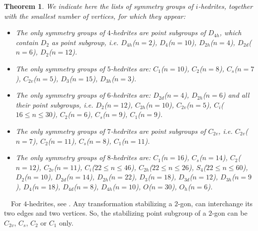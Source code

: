 \documentclass[12pt]{article}
\newtheorem{theorem}{Theorem}
\newcommand{\proof}{\noindent{\bf Proof.}\ \ }
\begin{document}
%
%
%



\begin{theorem}
We indicate here the lists of symmetry groups of $i$-hedrites,
together with the smallest number of vertices, for which they
appear:
\begin{itemize}
\item[(i)] The only symmetry groups of $4$-hedrites are point subgroups of $D_{4h}$, which contain $D_{2}$ as point subgroup, i.e. $D_{4h}$($n=2$), $D_4$($n=10$), $D_{2h}$($n=4$), $D_{2d}$($n=6$), $D_2$($n=12$).

\item[(ii)] The only symmetry groups of $5$-hedrites are: $C_1$($n=10$), $C_2$($n=8$), $C_s$($n=7$), $C_{2v}$($n=5$), $D_3$($n=15$), $D_{3h}$($n=3$).

\item[(iii)] The only symmetry groups of $6$-hedrites are: $D_{2d}$($n=4$), $D_{2h}$($n=6$) and all their point subgroups, i.e. $D_{2}$($n=12$), $C_{2h}$($n=10$), $C_{2v}$($n=5$), $C_i$($16\le n\le 30$), $C_{2}$($n=6$), $C_{s}$($n=9$), $C_{1}$($n=9$).

\item[(iv)] The only symmetry groups of $7$-hedrites are point subgroups of $C_{2v}$, i.e. $C_{2v}$($n=7$), $C_{2}$($n=11$), $C_{s}$($n=8$), $C_{1}$($n=11$).

\item[(v)] The only symmetry groups of $8$-hedrites are: $C_{1}$($n=16$), $C_s$($n=14$), $C_2$($n=12$), $C_{2v}$($n=11$), $C_i$($22\leq n\leq 46$), $C_{2h}$($22\leq n \leq 26$), $S_4$($22\leq n\leq 60$), $D_2$($n=10$), $D_{2d}$($n=14$), $D_{2h}$($n=22$), $D_3$($n=18$), $D_{3d}$($n=12$), $D_{3h}$($n=9$), $D_4$($n=18$), $D_{4d}$($n=8$), $D_{4h}$($n=10$), $O$($n=30$), $O_h$($n=6$).

\end{itemize}


\end{theorem}
\proof For $4$-hedrites, see \cite{DSt}. Any transformation
stabilizing a $2$-gon, can interchange its two edges and two vertices. So, the stabilizing point subgroup of a $2$-gon can be $C_{2v}$, $C_s$, $C_2$ or $C_1$ only.
\end{document}
